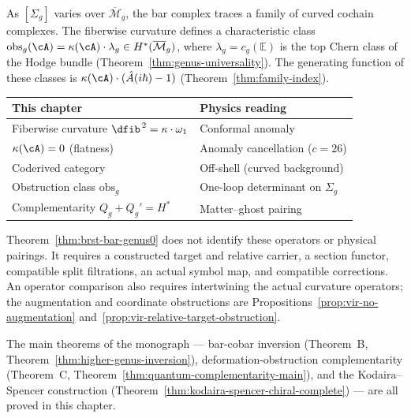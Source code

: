 As $[\Sigma_g]$ varies over $\overline{\mathcal{M}}_g$, the bar
complex traces a family of curved cochain complexes.  The fiberwise
curvature defines a characteristic class
$\mathrm{obs}_g(\cA) = \kappa(\cA) \cdot \lambda_g \in
H^*(\overline{\mathcal{M}}_g)$, where
$\lambda_g = c_g(\mathbb{E})$ is the top Chern class of the Hodge
bundle (Theorem~\ref{thm:genus-universality}).  The generating
function of these classes is $\kappa(\cA) \cdot (\hat{A}(i\hbar) - 1)$
(Theorem~\ref{thm:family-index}).


\begin{remark}\label{rem:anomaly-parallel-track}
\begin{center}
\small
\begin{tabular}{ll}
\textbf{This chapter} & \textbf{Physics reading} \\ \hline
Fiberwise curvature $\dfib^{\,2} = \kappa \cdot \omega_1$ & Conformal anomaly \\
$\kappa(\cA) = 0$ (flatness) & Anomaly cancellation ($c = 26$) \\
Coderived category & Off-shell (curved background) \\
Obstruction class $\mathrm{obs}_g$ & One-loop determinant on $\Sigma_g$ \\
Complementarity $Q_g + Q_g' = H^*$ & Matter--ghost pairing
\end{tabular}
\end{center}
Theorem~\ref{thm:brst-bar-genus0} does not identify these operators or physical pairings.
It requires a constructed target and relative carrier, a section functor, compatible split filtrations, an actual symbol map, and compatible corrections.
An operator comparison also requires intertwining the actual curvature operators; the augmentation and coordinate obstructions are Propositions~\ref{prop:vir-no-augmentation} and~\ref{prop:vir-relative-target-obstruction}.
\end{remark}

The main theorems of the monograph --- bar-cobar inversion
(Theorem~B, Theorem~\ref{thm:higher-genus-inversion}),
deformation-obstruction complementarity (Theorem~C,
Theorem~\ref{thm:quantum-complementarity-main}), and the
Kodaira--Spencer construction
(Theorem~\ref{thm:kodaira-spencer-chiral-complete}) --- are all
proved in this chapter.

